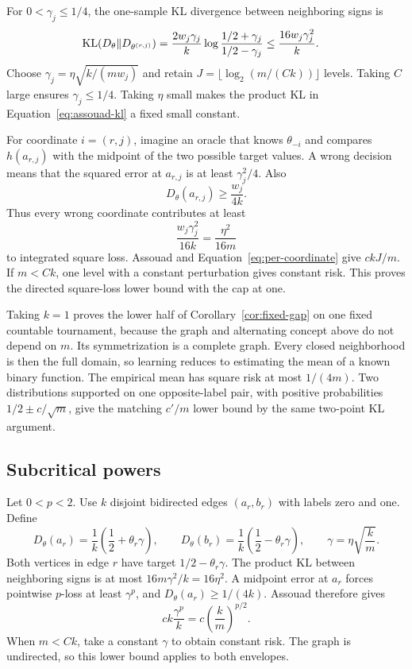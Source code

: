 For $0<\gamma_j\leq1/4$, the one-sample KL divergence between neighboring signs is
\begin{align}
\operatorname{KL}(D_\theta\|D_{\theta^{(r,j)}})
&=\frac{2w_j\gamma_j}{k}
\log\frac{1/2+\gamma_j}{1/2-\gamma_j}
\leq\frac{16w_j\gamma_j^2}{k}. \label{eq:exact-kl}
\end{align}
Choose $\gamma_j=\eta\sqrt{k/(mw_j)}$ and retain $J=\lfloor\log_2(m/(Ck))\rfloor$ levels. Taking $C$ large ensures $\gamma_j\leq1/4$. Taking $\eta$ small makes the product KL in Equation~\eqref{eq:assouad-kl} a fixed small constant.

For coordinate $i=(r,j)$, imagine an oracle that knows $\theta_{-i}$ and compares $h(a_{r,j})$ with the midpoint of the two possible target values. A wrong decision means that the squared error at $a_{r,j}$ is at least $\gamma_j^2/4$. Also
\[
D_\theta(a_{r,j})\geq\frac{w_j}{4k}.
\]
Thus every wrong coordinate contributes at least
\begin{equation}
\frac{w_j\gamma_j^2}{16k}=\frac{\eta^2}{16m} \label{eq:per-coordinate}
\end{equation}
to integrated square loss. Assouad and Equation~\eqref{eq:per-coordinate} give $c kJ/m$. If $m<Ck$, one level with a constant perturbation gives constant risk. This proves the directed square-loss lower bound with the cap at one.

Taking $k=1$ proves the lower half of Corollary~\ref{cor:fixed-gap} on one fixed countable tournament, because the graph and alternating concept above do not depend on $m$. Its symmetrization is a complete graph. Every closed neighborhood is then the full domain, so learning reduces to estimating the mean of a known binary function. The empirical mean has square risk at most $1/(4m)$. Two distributions supported on one opposite-label pair, with positive probabilities $1/2\pm c/\sqrt m$, give the matching $c'/m$ lower bound by the same two-point KL argument.

\subsection{Subcritical powers}

Let $0<p<2$. Use $k$ disjoint bidirected edges $(a_r,b_r)$ with labels zero and one. Define
\[
D_\theta(a_r)=\frac1k\left(\frac12+\theta_r\gamma\right),
\qquad
D_\theta(b_r)=\frac1k\left(\frac12-\theta_r\gamma\right),
\qquad
\gamma=\eta\sqrt{\frac{k}{m}}.
\]
Both vertices in edge $r$ have target $1/2-\theta_r\gamma$. The product KL between neighboring signs is at most $16m\gamma^2/k=16\eta^2$. A midpoint error at $a_r$ forces pointwise $p$-loss at least $\gamma^p$, and $D_\theta(a_r)\geq1/(4k)$. Assouad therefore gives
\[
c k\frac{\gamma^p}{k}=c\left(\frac{k}{m}\right)^{p/2}.
\]
When $m<Ck$, take a constant $\gamma$ to obtain constant risk. The graph is undirected, so this lower bound applies to both envelopes.


